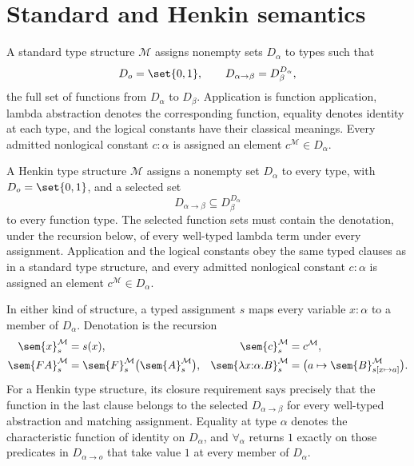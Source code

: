 \section{Standard and Henkin semantics}
\label{sec:simple-type-theory-02}

\begin{definition}
A standard type structure \(\mathcal M\) assigns nonempty sets \(D_\alpha\) to types such
that
\[
  D_o=\set{0,1},
  \qquad
  D_{\alpha\to\beta}=D_\beta^{D_\alpha},
\]
the full set of functions from \(D_\alpha\) to \(D_\beta\).  Application is
function application, lambda abstraction denotes the corresponding function,
equality denotes identity at each type, and the logical constants have their
classical meanings.  Every admitted nonlogical constant \(c{:}\alpha\) is
assigned an element \(c^{\mathcal M}\in D_\alpha\).
\end{definition}

\begin{definition}
A Henkin type structure \(\mathcal M\) assigns a nonempty set
\(D_\alpha\) to every type, with \(D_o=\set{0,1}\), and
a selected set
\[
  D_{\alpha\to\beta}\subseteq D_\beta^{D_\alpha}
\]
to every function type.  The selected function sets must contain the
denotation, under the recursion below, of every well-typed lambda term under
every assignment.  Application and the logical constants obey the same typed
clauses as in a standard type structure, and every admitted nonlogical constant
\(c{:}\alpha\) is assigned an element
\(c^{\mathcal M}\in D_\alpha\).
\end{definition}

In either kind of structure, a typed assignment \(s\) maps every variable
\(x{:}\alpha\) to a member of \(D_\alpha\).  Denotation is the recursion
\[
\begin{aligned}
  \sem{x}^{\mathcal M}_s&=s(x),
  &\sem{c}^{\mathcal M}_s&=c^{\mathcal M},\\
  \sem{FA}^{\mathcal M}_s
    &=\sem{F}^{\mathcal M}_s\bigl(\sem{A}^{\mathcal M}_s\bigr),
  &\sem{\lambda x{:}\alpha.B}^{\mathcal M}_s
    &=\bigl(a\mapsto
       \sem{B}^{\mathcal M}_{s[x\mapsto a]}\bigr).
\end{aligned}
\]
For a Henkin type structure, its closure requirement says precisely that the
function in the last clause belongs to the selected
\(D_{\alpha\to\beta}\) for every well-typed abstraction and matching
assignment.  Equality at type \(\alpha\) denotes the characteristic function
of identity on \(D_\alpha\), and \(\forall_\alpha\) returns \(1\) exactly on
those predicates in \(D_{\alpha\to o}\) that take value \(1\) at every member
of \(D_\alpha\).


